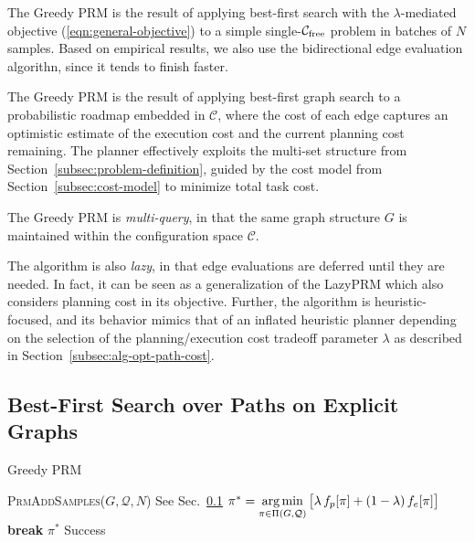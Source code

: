 The Greedy PRM is the result of applying
best-first search with the $\lambda$-mediated objective
(\ref{eqn:general-objective})
to a simple single-$\mathcal{C}_{\mbox{\scriptsize free}}$ problem
in batches of $N$ samples.
Based on empirical results, we also use the bidirectional edge evaluation
algorithn,
since it tends to finish faster.

The Greedy PRM is the result of applying
best-first graph search to
a probabilistic roadmap \cite{kavrakietal1996prm}
embedded in $\mathcal{C}$,
where the cost of each edge captures an optimistic estimate of
the execution cost and the current planning cost remaining.
The planner effectively exploits the multi-set structure
from Section~\ref{subsec:problem-definition},
guided by the cost model from Section~\ref{subsec:cost-model}
to minimize total task cost.

The Greedy PRM is \emph{multi-query},
in that the same graph
structure $G$ is maintained within the configuration space
$\mathcal{C}$.

The algorithm is also \emph{lazy},
in that edge evaluations are deferred until they are needed.
In fact, it can be seen as a generalization of the
LazyPRM \cite{bohlin2000lazyprm}
which also considers planning cost in its objective.
Further,
the algorithm is heuristic-focused,
and its behavior mimics that of an inflated heuristic planner
depending on the selection of the planning/execution cost
tradeoff parameter $\lambda$
as described in Section~\ref{subsec:alg-opt-path-cost}.

\subsection{Best-First Search over Paths on Explicit Graphs}
\label{subsec:alg-greedy-prm}

\begin{algorithm}
\caption{Greedy PRM}
\label{alg:greedy-prm}
\begin{algorithmic}[1]
\Loop
   \State \textsc{PrmAddSamples}($G, \mathcal{Q}, N$)
      \Comment See Sec.~\ref{subsec:alg-greedy-prm}
   \Loop
         \label{line:best-first-start}
      \State $\pi^* = \operatorname*{arg\,min}\limits_{\pi \in \Pi(G,\mathcal{Q})}
         \big[ \lambda \, f_p[\pi] + (1 - \lambda) \, f_e[\pi] \big]$
         \label{line:e8-select-optimistic-path}
        \State \textbf{break}
      \EndIf
         \State \Return $\pi^*$
            \Comment Success
      \EndIf
   \EndLoop
      \label{line:best-first-end}
\EndLoop
\EndProcedure
\end{algorithmic}
\end{algorithm}

